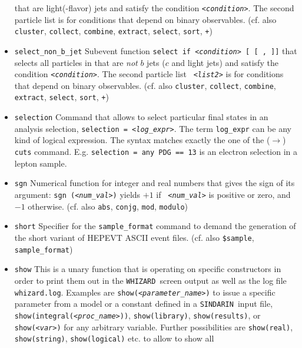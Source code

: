 \documentclass[12pt]{book}
\newcommand{\ttt}[1]{\texttt{#1}}
\newcommand{\whizard}{\ttt{WHIZARD}}
\newcommand{\sindarin}{\ttt{SINDARIN}}
\begin{document}
\begin{itemize}
that are light(-flavor) jets and satisfy the condition
\ttt{{\em <condition>}}. The second particle list \ttt{{\em <list2>}}
is for conditions that depend on binary observables. (cf. also
\ttt{cluster}, \ttt{collect}, \ttt{combine}, \ttt{extract},
\ttt{select}, \ttt{sort}, \ttt{+})
\item
\ttt{select\_non\_b\_jet} \newline
Subevent function \ttt{select if {\em <condition>} [{\em <list1>} [ ,
{\em <list2>}]]} that selects all particles in \ttt{{\em <list1>}}
that are {\em not} $b$ jets ($c$ and light jets) and satisfy the
condition \ttt{{\em <condition>}}. The second particle list \ttt{{\em
<list2>}} is for conditions that depend on binary
observables. (cf. also \ttt{cluster}, \ttt{collect}, \ttt{combine},
\ttt{extract}, \ttt{select}, \ttt{sort}, \ttt{+})
\item
\ttt{selection} \newline
Command that allows to select particular final states in an analysis
selection, \ttt{selection = {\em <log\_expr>}}. The term \ttt{log\_expr} can
be any kind of logical expression. The syntax matches exactly
the one of the ($\to$) \ttt{cuts} command. E.g. \ttt{selection = any
PDG == 13} is an electron selection in a lepton sample.
\item
\ttt{sgn} \newline
Numerical function for integer and real numbers that gives the sign of
its argument: \ttt{sgn ({\em <num\_val>})} yields $+1$ if \ttt{{\em
<num\_val>}} is positive or zero, and $-1$ otherwise. (cf. also
\ttt{abs}, \ttt{conjg}, \ttt{mod}, \ttt{modulo})
\item
\ttt{short} \newline
Specifier for the \ttt{sample\_format} command to demand the
generation of the short variant of HEPEVT ASCII event
files. (cf. also \ttt{\$sample}, \ttt{sample\_format})
\item
\ttt{show} \newline
This is a unary function that is operating on specific constructors in
order to print them out in the \whizard\ screen output as well as the
log file \ttt{whizard.log}. Examples are \ttt{show({\em <parameter\_name>})}
to issue a specific parameter from a model or a constant defined in a
\sindarin\ input file, \ttt{show(integral({\em <proc\_name>}))},
\ttt{show(library)}, \ttt{show(results)}, or \ttt{show({\em <var>})} for any
arbitrary variable. Further possibilities are \ttt{show(real)},
\ttt{show(string)}, \ttt{show(logical)} etc. to allow to show all

\end{itemize}
\end{document}

